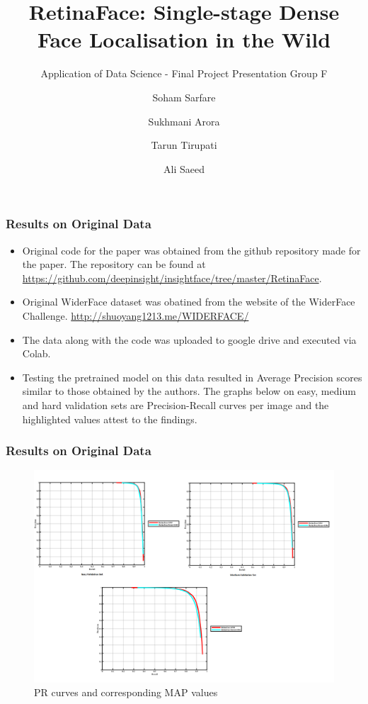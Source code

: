 \documentclass[11pt]{beamer}
\begin{document}
	\author[Soham, Sukhmani, Tarun, Ali]{Soham Sarfare \and Sukhmani Arora \and Tarun Tirupati \and Ali Saeed}
	\title[RetinaFace]{ RetinaFace: Single-stage Dense Face Localisation in the Wild}
	\subtitle{Application of Data Science - Final Project Presentation Group F}
	\begin{frame}[plain]
		\maketitle
	\end{frame}
	\begin{frame}
		\frametitle{Results on Original Data}
		\begin{itemize}
			\item Original code for the paper was obtained from the github repository made for the paper. The repository can be found at \url{https://github.com/deepinsight/insightface/tree/master/RetinaFace}. 
			\item Original WiderFace dataset was obatined from the website of the WiderFace Challenge. \url{http://shuoyang1213.me/WIDERFACE/} 
			\item The data along with the code was uploaded to google drive and executed via Colab.
			\item Testing the pretrained model on this data resulted in Average Precision scores similar to those obtained by the authors. The graphs below on easy, medium and hard validation sets are Precision-Recall curves per image and the highlighted values attest to the findings. 			
		\end{itemize}
	\end{frame}
\begin{frame}
	\frametitle{Results on Original Data}
	\begin{figure}
\includegraphics[width=0.75\linewidth]{final_out.png}
\caption{PR curves and corresponding MAP values}
		\end{figure}
	\end{frame}
\end{document}
